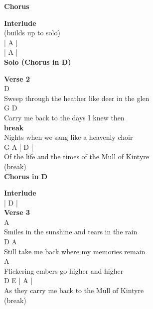 \documentclass[a4paper]{article}
\begin{document}
{{        }
        \textbf{Chorus}
        ~\\
        {
            \cutive
            \obeyspaces

        }
        \textbf{Interlude}
        ~\\
        {
            \cutive
            \obeyspaces
(builds up to solo)
\\
| A | %
\\
| A | %
\\

        }
        \textbf{Solo (Chorus in D)}
        ~\\
        {
            \cutive
            \obeyspaces

        }
        \textbf{Verse 2}
        ~\\
        {
            \cutive
            \obeyspaces
D
\\
Sweep through the heather like deer in the glen
\\
G                    D
\\
Carry me back to the days I knew then
\\

        }
        \textbf{break}
        ~\\
        {
            \cutive
            \obeyspaces
Nights when we sang like a heavenly choir
\\
       G                         A         | D | %
\\
Of the life and the times of the Mull of Kintyre
\\
                                           (break)
\\

        }
        \textbf{Chorus in D}
        ~\\
        {
            \cutive
            \obeyspaces

        }
        \textbf{Interlude}
        ~\\
        {
            \cutive
            \obeyspaces
| D | %
\\

        }
        \textbf{Verse 3}
        ~\\
        {
            \cutive
            \obeyspaces
A
\\
Smiles in the sunshine and tears in the rain
\\
D                           A
\\
Still take me back where my memories remain
\\
A
\\
Flickering embers go higher and higher
\\
        D                    E        | A  | %
\\
As they carry me back to the Mull of Kintyre
\\
                                      (break)
\\

}}
\end{document}
